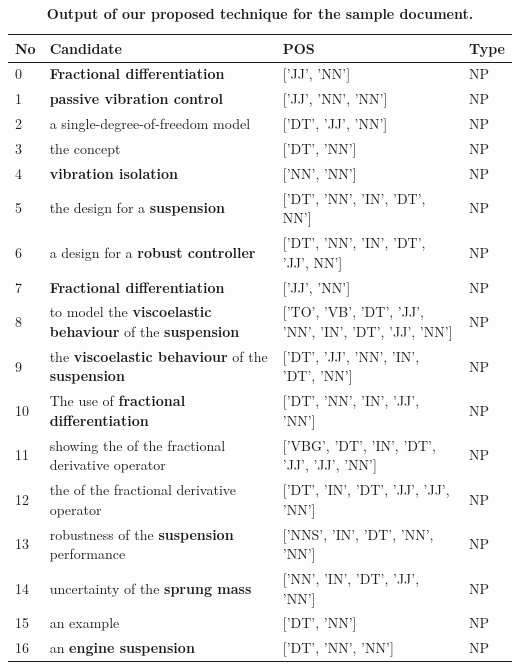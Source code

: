 \documentclass{ieeeaccess}
\begin{document}
\begin{table}[!h]
\centering
\caption{\textbf{Output of our proposed technique for the sample document.}}
\label{tab:t10}
\begin{tabular}{|l|l|l|l|} 
\hline
\textbf{No} & \textbf{Candidate} & \textbf{POS} & \textbf{Type}  \\ 
\hline
0  &    \textbf{Fractional differentiation }                           &  ['JJ', 'NN']   & NP    \\
1  &    \textbf{passive vibration control}                             &  ['JJ', 'NN', 'NN']   & NP    \\
2  &    a single-degree-of-freedom model                      &  ['DT', 'JJ', 'NN']   & NP    \\
3  &    the concept                                           &  ['DT', 'NN']   & NP    \\
4  &    \textbf{vibration isolation}                                   &  ['NN', 'NN']   & NP    \\
5  &    the design for a \textbf{suspension}                           &  ['DT', 'NN', 'IN', 'DT', NN']   & NP    \\
6  &    a design for a \textbf{robust controller}                      &  ['DT', 'NN', 'IN', 'DT', 'JJ', NN']   & NP    \\
7  &    \textbf{Fractional differentiation}                            &  ['JJ', 'NN']   & NP    \\
8  &    to model the \textbf{viscoelastic behaviour} of the \textbf{suspension} &  ['TO', 'VB', 'DT', 'JJ', 'NN', 'IN', 'DT', 'JJ', 'NN']   & NP    \\
9  &    the \textbf{viscoelastic behaviour} of the \textbf{suspension}          &  ['DT', 'JJ', 'NN', 'IN', 'DT', 'NN']    & NP    \\
10 &    The use of \textbf{fractional differentiation}                 &  ['DT', 'NN', 'IN', 'JJ', 'NN']   & NP    \\
11 &    showing the of the fractional derivative operator     &  ['VBG', 'DT', 'IN', 'DT', 'JJ', 'JJ', 'NN']   & NP    \\
12 &    the of the fractional derivative operator             &  ['DT', 'IN', 'DT', 'JJ', 'JJ', 'NN']   & NP    \\
13 &    robustness of the \textbf{suspension} performance              &  ['NNS', 'IN', 'DT', 'NN', 'NN']   & NP    \\
14 &    uncertainty of the \textbf{sprung mass}                        &  ['NN', 'IN', 'DT', 'JJ', 'NN']   & NP    \\
15 &    an example                                            &  ['DT', 'NN']   & NP    \\
16 &    an \textbf{engine suspension}                                  &  ['DT', 'NN', 'NN']   & NP    \\
\hline
\end{tabular}
\end{table}
\end{document}
